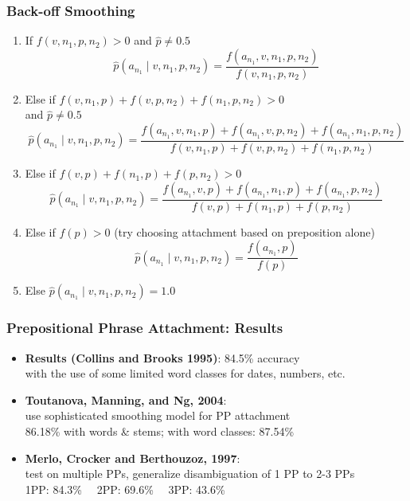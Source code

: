 \begin{frame}
\frametitle{Back-off Smoothing}
\begin{enumerate}
\item<1-> If $f(v,n_1,p,n_2) > 0$ and $\hat{p} \neq 0.5$
{\small
\[ \hat{p}(a_{n_1} \mid  v,n_1,p,n_2) = \frac{ f(a_{n_1},v,n_1,p,n_2) }{ f(v,n_1,p,n_2)
} \]
}
\item<2-> Else if $f(v,n_1,p) + f(v,p,n_2) + f(n_1,p,n_2) > 0$ \\
and $\hat{p} \neq 0.5$
{\small
\[ \hat{p}(a_{n_1} \mid  v,n_1,p,n_2) = \frac{ f(a_{n_1},v,n_1,p) + f(a_{n_1},v,p,n_2) +
  f(a_{n_1},n_1,p,n_2) }{ f(v,n_1,p) + f(v,p,n_2) + f(n_1,p,n_2) } \]
  }
\item<3-> Else if $f(v,p) + f(n_1,p) + f(p,n_2) > 0$
{\small
\[ \hat{p}(a_{n_1} \mid  v,n_1,p,n_2) = \frac{ f(a_{n_1},v,p) + f(a_{n_1},n_1,p) +
  f(a_{n_1},p,n_2) }{ f(v,p) + f(n_1,p) + f(p,n_2) } \]
}
\item<4-> Else if $f(p) > 0$ (try choosing attachment based on preposition alone)
{\small
\[ \hat{p}(a_{n_1} \mid  v,n_1,p,n_2) = \frac{ f(a_{n_1},p) }{ f(p) } \]
}\item<5-> Else {\small
\( \hat{p}(a_{n_1} \mid  v,n_1,p,n_2) = 1.0 \)
}
\end{enumerate}
\end{frame}

\begin{frame}
\frametitle{Prepositional Phrase Attachment: Results}
  \begin{itemize}[<+->]
  \item {\bf Results (Collins and Brooks 1995)}: 84.5\% accuracy \\
  with the use of some limited word classes for dates, numbers, etc.
  \item {\bf Toutanova, Manning, and Ng, 2004}: \\
use sophisticated smoothing model for PP attachment\\
86.18\% with words \& stems; with word classes: 87.54\%
  \item {\bf Merlo, Crocker and Berthouzoz, 1997}:\\
 test on multiple PPs, generalize disambiguation of 1 PP to 2-3 PPs\\
1PP: 84.3\% \ \ 2PP: 69.6\% \ \ 3PP: 43.6\% \\
  \end{itemize}
\end{frame}

